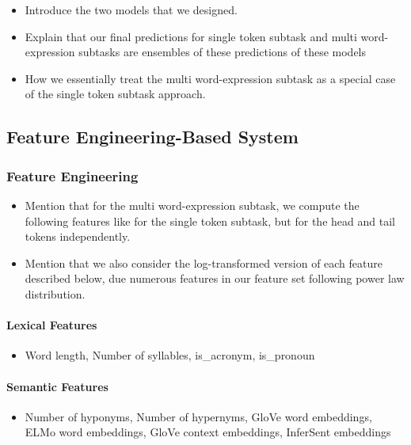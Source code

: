 \documentclass[11pt,a4paper]{article}
\begin{document}
\begin{itemize}
  \item Introduce the two models that we designed.
  \item Explain that our final predictions for single token subtask and multi word-expression subtasks are ensembles of these predictions of these models
  \item How we essentially treat the multi word-expression subtask as a special case of the single token subtask approach.
\end{itemize}

\subsection{Feature Engineering-Based System}

\subsubsection{Feature Engineering}

\begin{itemize}
  \item Mention that for the multi word-expression subtask, we compute the following features like for the single token subtask, but for the head and tail tokens independently.
  \item Mention that we also consider the log-transformed version of each feature described below, due numerous features in our feature set following power law distribution.
\end{itemize}

\paragraph{Lexical Features}

\begin{itemize}
  \item Word length, Number of syllables, is\_acronym, is\_pronoun
\end{itemize}
  
\paragraph{Semantic Features}

\begin{itemize}
  \item Number of hyponyms, Number of hypernyms, GloVe word embeddings, ELMo word embeddings, GloVe context embeddings, InferSent embeddings 
\end{itemize}
\end{document}

